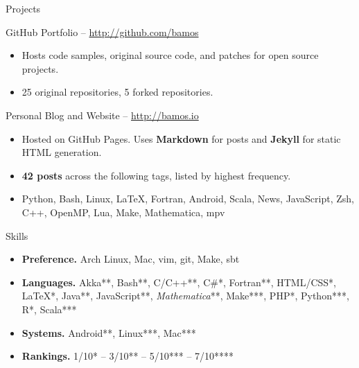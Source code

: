 \documentclass[letter]{article}
\begin{document}
    \begin{minipage}{\textwidth}
    \bigskip
  

\end{minipage}\medskip

\begin{minipage}{\textwidth}
{\huge Projects }


  
    {\large GitHub Portfolio -- \url{ http://github.com/bamos } }
    \begin{itemize}
      
        \item Hosts code samples, original source code, and patches for open source projects.
      
        \item 25 original repositories, 5 forked repositories.
      
    \end{itemize}
    \bigskip
  
    {\large Personal Blog and Website -- \url{ http://bamos.io } }
    \begin{itemize}
      
        \item Hosted on GitHub Pages. Uses {\bf Markdown} for posts and {\bf Jekyll} for static HTML generation.
      
        \item {\bf 42 posts} across the following tags, listed by highest frequency.
      
        \item Python, Bash, Linux, LaTeX, Fortran, Android, Scala, News, JavaScript, Zsh, C++, OpenMP, Lua, Make, Mathematica, mpv
      
    \end{itemize}
    \bigskip
  

\end{minipage}\medskip

\begin{minipage}{\textwidth}
{\huge Skills }


  \begin{itemize}
    
      \item { \bf Preference. } Arch Linux, Mac, vim, git, Make, sbt
    
      \item { \bf Languages. } Akka**, Bash**, C/C++**, C\#*, Fortran**, HTML/CSS*, \LaTeX**, Java**, JavaScript**, {\it Mathematica}**, Make***, PHP*, Python***, R*, Scala***
    
      \item { \bf Systems. } Android**, Linux***, Mac***
    
      \item { \bf Rankings. } 1/10* -- 3/10** -- 5/10*** -- 7/10****
    
  \end{itemize}
  \bigskip

\end{minipage}\medskip
\end{document}
